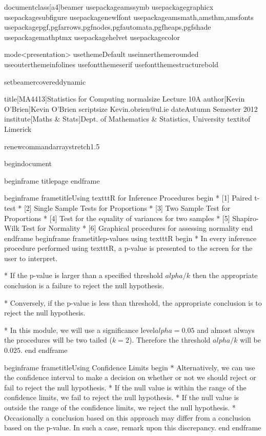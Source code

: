 documentclass[a4]{beamer}
usepackage{amssymb}
usepackage{graphicx}
usepackage{subfigure}
usepackage{newlfont}
usepackage{amsmath,amsthm,amsfonts}
usepackage{pgf,pgfarrows,pgfnodes,pgfautomata,pgfheaps,pgfshade}
usepackage{mathptmx}  %
usepackage{helvet}   %
usepackage{color}

mode<presentation> {
 usetheme{Default} %
 useinnertheme{rounded}
 useoutertheme{infolines}
 usefonttheme{serif}
usefonttheme{structurebold}
}

setbeamercovered{dynamic}

title[MA4413]{Statistics for Computing  {normalsize Lecture 10A}}
author[Kevin O'Brien]{Kevin O'Brien  {scriptsize Kevin.obrien@ul.ie}}
date{Autumn Semester 2012}
institute[Maths & Stats]{Dept. of Mathematics & Statistics,  University textit{of} Limerick}

renewcommand{arraystretch}{1.5}

begin{document}


begin{frame}
titlepage
end{frame}

begin{frame}
frametitle{Using texttt{R} for Inference Procedures}
begin{ }
        * [1] Paired t-test
        * [2] Single Sample Tests for Proportions
        * [3] Two Sample Test for Proportions
        * [4] Test for the equality of variances for two samples
        * [5] Shapiro-Wilk Test for Normality
        * [6] Graphical procedures for assessing normality
end{ }
end{frame}
begin{frame}
frametitle{p-values using texttt{R}}
begin{ }
         * In every inference procedure performed using texttt{R}, a p-value is presented to the screen for the user to interpret.

         * If the p-value is larger than a specified threshold $alpha/k$ then the appropriate conclusion is a
failure to reject the null hypothesis.

         * Conversely, if the p-value is less than threshold, the appropriate conclusion is to reject the null hypothesis.

         * In this module, we will use a significance level$alpha=0.05$ and almost always the procedures will be two tailed ($k=2$). Therefore the threshold $alpha/k$ will be $0.025$.
end{ }
end{frame}

begin{frame}
frametitle{Using Confidence Limits}
begin{ }
         * Alternatively, we can use the confidence interval to make a decision on whether or not we should reject or fail to reject the null hypothesis.
         * If the null value is within the range of the confidence limits, we fail to reject the null hypothesis.
         * If the null value is outside the range of the confidence limits, we reject the null hypothesis.
         * Occasionally a conclusion based on this approach may differ from a conclusion based on the p-value. In such a case, remark upon this discrepancy.
end{ }
end{frame}


